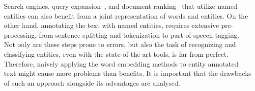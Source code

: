 Search engines, query expansion~, and document ranking~ that utilize named entities can also benefit from a joint representation of words and entities.
On the other hand, annotating the text with named entities, requires extensive pre-processing, from sentence splitting and tokenization to part-of-speech tagging. Not only are these steps prone to errors, but also the task of recognizing and classifying entities, even with the state-of-the-art tools, is far from perfect. Therefore, naively applying the word embedding methods to entity annotated text might cause more problems than benefits. It is important that the drawbacks of such an approach alongside its advantages are analysed. 

%


